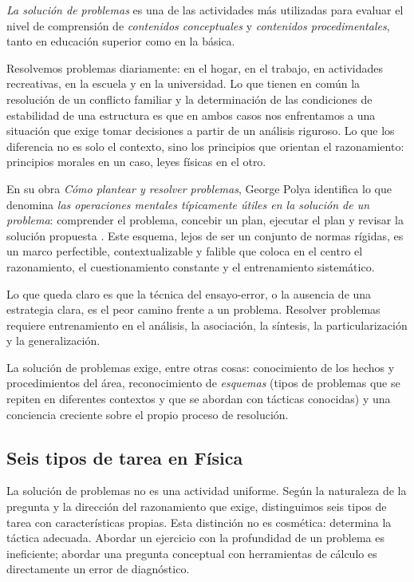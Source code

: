 \documentclass[11pt]{book}
\begin{document}
{\it La solución de problemas} es una de las actividades más utilizadas para evaluar el nivel de comprensión de {\it contenidos conceptuales} y {\it contenidos procedimentales}, tanto en educación superior como en la básica.

Resolvemos problemas diariamente: en el hogar, en el trabajo, en actividades recreativas, en la escuela y en la universidad. Lo que tienen en común la resolución de un conflicto familiar y la determinación de las condiciones de estabilidad de una estructura es que en ambos casos nos enfrentamos a una situación que exige tomar decisiones a partir de un análisis riguroso. Lo que los diferencia no es solo el contexto, sino los principios que orientan el razonamiento: principios morales en un caso, leyes físicas en el otro.

En su obra \textit{Cómo plantear y resolver problemas}, George Polya identifica lo que denomina {\it las operaciones mentales típicamente útiles en la solución de un problema}: comprender el problema, concebir un plan, ejecutar el plan y revisar la solución propuesta \cite{Polya1945}. Este esquema, lejos de ser un conjunto de normas rígidas, es un marco perfectible, contextualizable y falible que coloca en el centro el razonamiento, el cuestionamiento constante y el entrenamiento sistemático.

Lo que queda claro es que la técnica del ensayo-error, o la ausencia de una estrategia clara, es el peor camino frente a un problema. Resolver problemas requiere entrenamiento en el análisis, la asociación, la síntesis, la particularización y la generalización.

La solución de problemas exige, entre otras cosas: conocimiento de los hechos y procedimientos del área, reconocimiento de {\it esquemas} (tipos de problemas que se repiten en diferentes contextos y que se abordan con tácticas conocidas) y una conciencia creciente sobre el propio proceso de resolución.

\subsection*{Seis tipos de tarea en Física}

La solución de problemas no es una actividad uniforme. Según la naturaleza de la pregunta y la dirección del razonamiento que exige, distinguimos seis tipos de tarea con características propias. Esta distinción no es cosmética: determina la táctica adecuada. Abordar un ejercicio con la profundidad de un problema es ineficiente; abordar una pregunta conceptual con herramientas de cálculo es directamente un error de diagnóstico.
\end{document}
